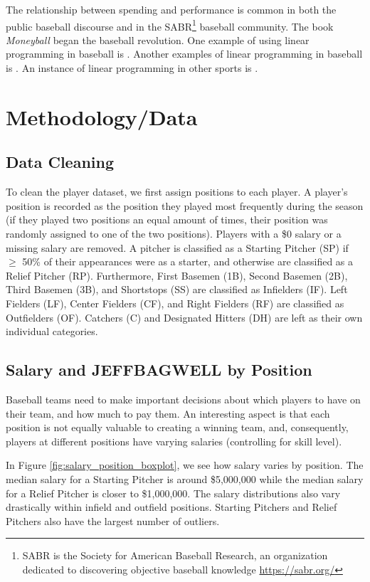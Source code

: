 \documentclass{article}
\begin{document}
The relationship between spending and performance is common in both the public baseball discourse and in the SABR\footnote{SABR is the Society for American Baseball Research, an organization dedicated to discovering objective baseball knowledge \url{https://sabr.org/}} baseball community. The book \emph{Moneyball} \cite{Moneyball} began the baseball revolution. One example of using linear programming in baseball is \cite{McIntyre2016}. Another examples of linear programming in baseball is \cite{Adler99baseball}. An instance of linear programming in other sports is \cite{Aramouni2021}.

\section{Methodology/Data}

\subsection{Data Cleaning}

To clean the player dataset, we first assign positions to each player. A player's position is recorded as the position they played most frequently during the season (if they played two positions an equal amount of times, their position was randomly assigned to one of the two positions). Players with a \$0 salary or a missing salary are removed. A pitcher is classified as a Starting Pitcher (SP) if $\geq$ 50\% of their appearances were as a starter, and otherwise are classified as a Relief Pitcher (RP). Furthermore, First Basemen (1B), Second Basemen (2B), Third Basemen (3B), and Shortstops (SS) are classified as Infielders (IF). Left Fielders (LF), Center Fielders (CF), and Right Fielders (RF) are classified as Outfielders (OF). Catchers (C) and Designated Hitters (DH) are left as their own individual categories. 

\subsection{Salary and JEFFBAGWELL by Position}

Baseball teams need to make important decisions about which players to have on their team, and how much to pay them. An interesting aspect is that each position is not equally valuable to creating a winning team, and, consequently, players at different positions have varying salaries (controlling for skill level). 

In Figure \ref{fig:salary_position_boxplot}, we see how salary varies by position. The median salary for a Starting Pitcher is around \$5,000,000 while the median salary for a Relief Pitcher is closer to \$1,000,000. The salary distributions also vary drastically within infield and outfield positions. Starting Pitchers and Relief Pitchers also have the largest number of outliers.
\end{document}
